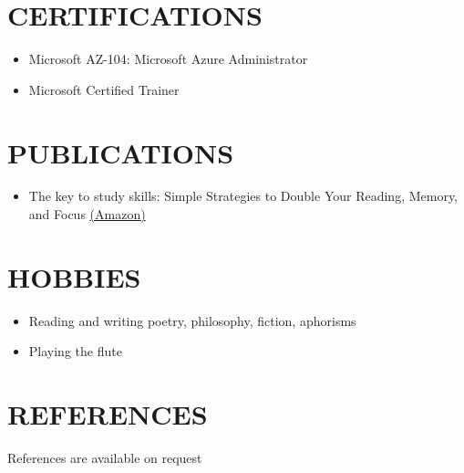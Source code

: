\documentclass[margin, 10pt]{res} %
\begin{document}
\begin{resume}
\section{CERTIFICATIONS}
\begin{itemize}
\item Microsoft AZ-104: Microsoft Azure Administrator 
\item Microsoft Certified Trainer
\end{itemize}
\section{PUBLICATIONS}
\begin{itemize}
\item The key to study skills: Simple Strategies to Double Your Reading, Memory, and Focus \hfill \href{https://amzn.to/3myBJlJ}{(Amazon)}
\end{itemize}
\section{HOBBIES}
\begin{itemize}
\item Reading and writing poetry, philosophy, fiction, aphorisms
\item Playing the flute
\end{itemize}
\section{REFERENCES}
References are available on request


\end{resume}
\end{document}
